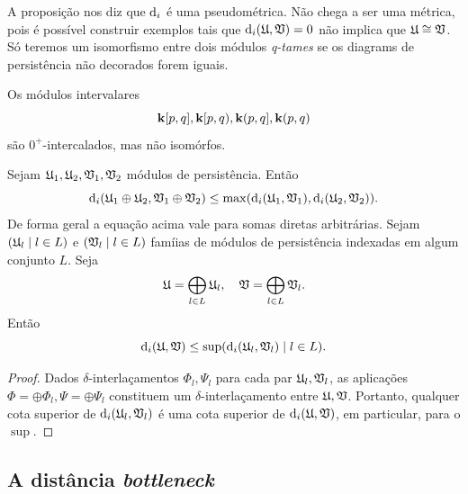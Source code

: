 A proposição nos diz que $\text{d}_i$ é uma pseudométrica. Não chega a ser uma métrica, 
pois é possível construir exemplos tais que $\text{d}_i(\mathfrak{U}, \mathfrak{V}) = 0$ não implica
que $\mathfrak{U} \cong \mathfrak{V}$. Só teremos um isomorfismo entre dois módulos \textit{q-tames}
se os diagrams de persistência não decorados forem iguais. 

\begin{ex}
    Os módulos intervalares
    \begin{equation*}
        \mathbf{k}[p,q], \mathbf{k}[p,q), \mathbf{k}(p,q], \mathbf{k}(p,q)
    \end{equation*}
    são $0^+$-intercalados, mas não isomórfos. 
\end{ex}

\begin{propo}\label{teo:direct_sum_dist}
    Sejam $\mathfrak{U}_1, \mathfrak{U}_2, \mathfrak{V}_1, \mathfrak{V}_2$ módulos de persistência. Então
    \begin{equation*}
        \text{d}_i(\mathfrak{U}_1 \oplus \mathfrak{U}_2, \mathfrak{V}_1 \oplus \mathfrak{V}_2) \leq \max(\text{d}_i(\mathfrak{U}_1,
        \mathfrak{V}_1), \text{d}_i(\mathfrak{U}_2, \mathfrak{V}_2)).
    \end{equation*}
    De forma geral a equação acima vale para somas diretas arbitrárias. Sejam $(\mathfrak{U}_l \mid l \in L)$ 
    e $(\mathfrak{V}_l \mid l \in L)$ famíias de módulos de persistência indexadas em algum conjunto $L$. Seja
    \begin{equation*}
        \mathfrak{U} = \bigoplus_{l \in L} \mathfrak{U}_l, \quad \mathfrak{V} = \bigoplus_{l \in L} \mathfrak{V}_l.
    \end{equation*}
    Então
    \begin{equation*}
        \text{d}_i(\mathfrak{U}, \mathfrak{V}) \leq \sup(\text{d}_i(\mathfrak{U}_l, \mathfrak{V}_l) \mid l \in L).
    \end{equation*}
\end{propo}
\begin{proof}
    Dados $\delta$-interlaçamentos $\Phi_l, \Psi_l$ para cada par $\mathfrak{U}_l, \mathfrak{V}_l$, as aplicações
    $\Phi = \oplus\Phi_l, \Psi = \oplus \Psi_l$ constituem um $\delta$-interlaçamento entre 
    $\mathfrak{U}, \mathfrak{V}$. Portanto, qualquer cota superior de $\text{d}_i(\mathfrak{U}_l, \mathfrak{V}_l)$ é uma cota superior
    de $\text{d}_i(\mathfrak{U}, \mathfrak{V})$, em particular, para o $\sup$. 
\end{proof}

\subsection{A distância \textit{bottleneck}}

